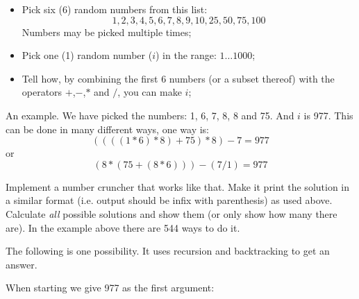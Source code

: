 \begin{Exercise}[title={Number cruncher},difficulty=9]
\label{ex:numbercruncher}
\begin{itemize}
\item{Pick six (6) random numbers from this list:
$$1, 2, 3, 4, 5, 6, 7, 8, 9, 10, 25, 50, 75, 100$$
Numbers may be picked multiple times;}
\item{Pick one (1) random number ($i$) in the range: $1 \ldots 1000$;}
\item{Tell how, by combining the first 6 numbers (or a subset thereof)
with the operators $+$,$-$,$*$ and $/$, you can make $i$;}
\end{itemize}
An example. We have picked the numbers: 1, 6, 7, 8, 8 and 75. And $i$ is
977. This can be done in many different ways, one way is:
$$ ((((1 * 6) * 8) + 75) * 8) - 7 = 977$$ 
or
$$ (8*(75+(8*6)))-(7/1) = 977$$

\Question\label{ex:cruncher q1}
Implement a number cruncher that works like that. Make it print the
solution in a similar format (i.e. output should be infix with
parenthesis) as used above.
\Question\label{ex:cruncher q2}
Calculate \emph{all} possible solutions and show them (or only show how
many there are). In the example above there are 544 ways to do it.
\end{Exercise}

\begin{Answer}
\Question 
The following is one possibility. It uses recursion and backtracking to get
an answer.


\Question
When starting  we give 977 as the first argument:
\vspace{1em}

\end{Answer}
